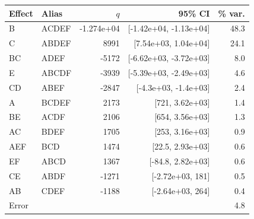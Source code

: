 \begin{tabular}{@{}llrrr@{}}
\toprule
Effect & Alias & $q$ & 95\% CI & \% var. \\
\midrule
B & ACDEF & -1.274e+04 & [-1.42e+04, -1.13e+04] & 48.3 \\
C & ABDEF & 8991 & [7.54e+03, 1.04e+04] & 24.1 \\
BC & ADEF & -5172 & [-6.62e+03, -3.72e+03] & 8.0 \\
E & ABCDF & -3939 & [-5.39e+03, -2.49e+03] & 4.6 \\
CD & ABEF & -2847 & [-4.3e+03, -1.4e+03] & 2.4 \\
A & BCDEF & 2173 & [721, 3.62e+03] & 1.4 \\
BE & ACDF & 2106 & [654, 3.56e+03] & 1.3 \\
AC & BDEF & 1705 & [253, 3.16e+03] & 0.9 \\
AEF & BCD & 1474 & [22.5, 2.93e+03] & 0.6 \\
EF & ABCD & 1367 & [-84.8, 2.82e+03] & 0.6 \\
CE & ABDF & -1271 & [-2.72e+03, 181] & 0.5 \\
AB & CDEF & -1188 & [-2.64e+03, 264] & 0.4 \\
Error & & & & 4.8 \\
\bottomrule
\end{tabular}
